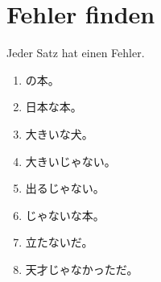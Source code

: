 \documentclass[11pt,a4paper,DIV=12]{scrartcl}
\begin{document}
\section{Fehler finden}

Jeder Satz hat einen Fehler.

\begin{enumerate}[itemsep=8pt]
\item {}の本。 \hfill \lin[7cm]
\item 日本な本。 \hfill \lin[7cm]
\item 大きいな犬。 \hfill \lin[7cm]
\item 大きいじゃない。 \hfill \lin[7cm]
\item 出るじゃない。 \hfill \lin[7cm]
\item {}じゃないな本。 \hfill \lin[7cm]
\item 立たないだ。 \hfill \lin[7cm]
\item 天才じゃなかっただ。 \hfill \lin[7cm]
\end{enumerate}
\end{document}
